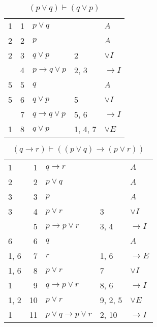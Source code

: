 \documentclass{article}
\begin{document}
\begin{table}[htbp]\caption*{$(p∨q) ⊢ (q∨p)$}\centering\begin{tabular}{lrlll}
{1} & 1 & $p∨q$ & {} & $A$ \\
{2} & 2 & $p$ & {} & $A$ \\
{2} & 3 & $q∨p$ & {2} & $∨I$ \\
{} & 4 & $p→q∨p$ & {2, 3} & $→I$ \\
{5} & 5 & $q$ & {} & $A$ \\
{5} & 6 & $q∨p$ & {5} & $∨I$ \\
{} & 7 & $q→q∨p$ & {5, 6} & $→I$ \\
{1} & 8 & $q∨p$ & {1, 4, 7} & $∨E$ \\
\end{tabular}
\end{table}
\begin{table}[htbp]\caption*{$(q→r) ⊢ ((p∨q)→(p∨r))$}\centering\begin{tabular}{lrlll}
{1} & 1 & $q→r$ & {} & $A$ \\
{2} & 2 & $p∨q$ & {} & $A$ \\
{3} & 3 & $p$ & {} & $A$ \\
{3} & 4 & $p∨r$ & {3} & $∨I$ \\
{} & 5 & $p→p∨r$ & {3, 4} & $→I$ \\
{6} & 6 & $q$ & {} & $A$ \\
{1, 6} & 7 & $r$ & {1, 6} & $→E$ \\
{1, 6} & 8 & $p∨r$ & {7} & $∨I$ \\
{1} & 9 & $q→p∨r$ & {8, 6} & $→I$ \\
{1, 2} & 10 & $p∨r$ & {9, 2, 5} & $∨E$ \\
{1} & 11 & $p∨q→p∨r$ & {2, 10} & $→I$ \\
\end{tabular}
\end{table}
\end{document}
